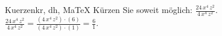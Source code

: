 \begin{MAufgabe}{Kuerzen}{kr, dh, MaTeX}
K\"urzen Sie soweit m\"oglich: $\frac{24\, x^4\, z^2}{4\, x^4\, z^2}$.\\ 
\ifLsg\MLoesung
\quad $\frac{24\, x^4\, z^2}{4\, x^4\, z^2}=\frac{(4\, x^4\, z^2)\cdot(6)}{(4\, x^4\, z^2)\cdot(1)}=\frac{6}{1}$.\else\relax\fi
 \end{MAufgabe}